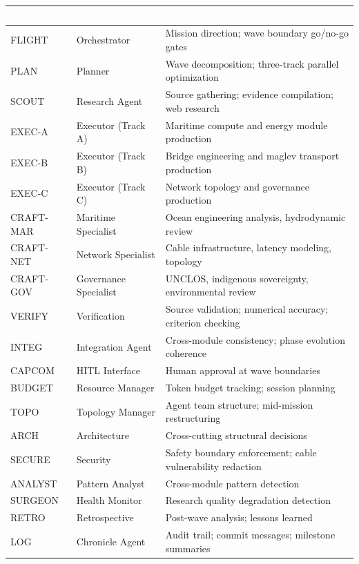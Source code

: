 \documentclass[11pt,letterpaper]{article}
\newcommand{\tableheader}[1]{\textbf{\sffamily\textcolor{white}{#1}}}
\begin{document}
\begin{center}
\begin{tabularx}{\textwidth}{L{2cm}L{2.5cm}X}
\toprule
{}
\tableheader{Role} & \tableheader{Agent} & \tableheader{Responsibility} \\
\midrule
FLIGHT & Orchestrator & Mission direction; wave boundary go/no-go gates \\
PLAN & Planner & Wave decomposition; three-track parallel optimization \\
SCOUT & Research Agent & Source gathering; evidence compilation; web research \\
EXEC-A & Executor (Track A) & Maritime compute and energy module production \\
EXEC-B & Executor (Track B) & Bridge engineering and maglev transport production \\
EXEC-C & Executor (Track C) & Network topology and governance production \\
CRAFT-MAR & Maritime Specialist & Ocean engineering analysis, hydrodynamic review \\
CRAFT-NET & Network Specialist & Cable infrastructure, latency modeling, topology \\
CRAFT-GOV & Governance Specialist & UNCLOS, indigenous sovereignty, environmental review \\
VERIFY & Verification & Source validation; numerical accuracy; criterion checking \\
INTEG & Integration Agent & Cross-module consistency; phase evolution coherence \\
CAPCOM & HITL Interface & Human approval at wave boundaries \\
BUDGET & Resource Manager & Token budget tracking; session planning \\
TOPO & Topology Manager & Agent team structure; mid-mission restructuring \\
ARCH & Architecture & Cross-cutting structural decisions \\
SECURE & Security & Safety boundary enforcement; cable vulnerability redaction \\
ANALYST & Pattern Analyst & Cross-module pattern detection \\
SURGEON & Health Monitor & Research quality degradation detection \\
RETRO & Retrospective & Post-wave analysis; lessons learned \\
LOG & Chronicle Agent & Audit trail; commit messages; milestone summaries \\
\bottomrule
\end{tabularx}
\end{center}
\end{document}
